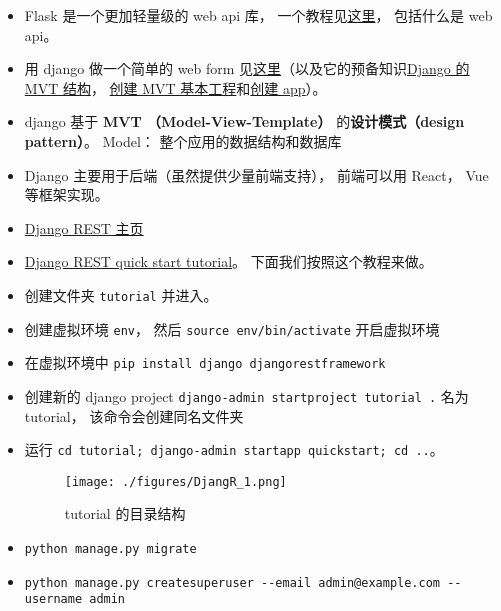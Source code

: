 

\begin{issues}
\issueDraft
\end{issues}

\begin{itemize}
\item Flask 是一个更加轻量级的 web api 库， 一个教程见\href{https://programminghistorian.org/en/lessons/creating-apis-with-python-and-flask}{这里}， 包括什么是 web api。
\item 用 django 做一个简单的 web form 见\href{https://www.geeksforgeeks.org/how-to-create-a-form-using-django-forms/}{这里}（以及它的预备知识\href{https://www.geeksforgeeks.org/django-project-mvt-structure}{Django 的 MVT 结构}， \href{https://www.geeksforgeeks.org/how-to-create-a-basic-project-using-mvt-in-django/}{创建 MVT 基本工程}和\href{https://www.geeksforgeeks.org/how-to-create-an-app-in-django/}{创建 app}）。
\item django 基于 \textbf{MVT （Model-View-Template）} 的\textbf{设计模式（design pattern）}。 Model： 整个应用的数据结构和数据库
\item Django 主要用于后端（虽然提供少量前端支持）， 前端可以用 React， Vue 等框架实现。
\item \href{https://www.django-rest-framework.org/}{Django REST 主页}
\item \href{https://www.django-rest-framework.org/tutorial/quickstart/}{Django REST quick start tutorial}。 下面我们按照这个教程来做。
\item 创建文件夹 \verb|tutorial| 并进入。
\item 创建虚拟环境 \verb|env|， 然后 \verb|source env/bin/activate| 开启虚拟环境
\item 在虚拟环境中 \verb|pip install django djangorestframework|
\item 创建新的 django project \verb|django-admin startproject tutorial .| 名为 tutorial， 该命令会创建同名文件夹
\item 运行 \verb|cd tutorial; django-admin startapp quickstart; cd ..|。
\begin{figure}[ht]
\centering
\texttt{[image: ./figures/DjangR\_1.png]}
\caption{tutorial 的目录结构} \label{DjangR_fig1}
\end{figure}
\item \verb|python manage.py migrate|
\item \verb|python manage.py createsuperuser --email admin@example.com --username admin|

\end{itemize}
